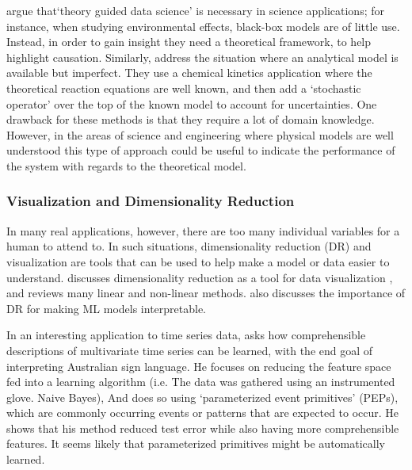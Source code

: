     \citet{Faghmous2014-og} argue that`theory guided data science' is necessary in science applications; for instance, when studying environmental effects, black-box models are of little use. Instead, in order to gain insight they need a theoretical framework, to help highlight causation. Similarly, \citet{Morrison2016-fz} address the situation where an analytical model is available but imperfect. They use a chemical kinetics application where the theoretical reaction equations are well known, and then add a `stochastic operator' over the top of the known model to account for uncertainties. One drawback for these methods is that they require a lot of domain knowledge. However, in the areas of science and engineering where physical models are well understood this type of approach could be useful to indicate the performance of the system with regards to the theoretical model. 

\subsubsection{Visualization and Dimensionality Reduction}
     In many real applications, however, there are too many individual variables for a human to attend to. In such situations, dimensionality reduction (DR) and visualization are tools that can be used to help make a model or data easier to understand. \citet{Venna2007-yj} discusses dimensionality reduction as a tool for data visualization , and reviews many linear and non-linear  methods. \citet{Vellido2012-nm} also discusses the importance of DR for making ML models interpretable.

    In an interesting application to time series data, \citet{Kadous1999-rx} asks how comprehensible descriptions of multivariate time series can be learned, with the end goal of interpreting Australian sign language. He focuses on reducing the feature space fed into a learning algorithm (i.e. The data was gathered using an instrumented glove. Naive Bayes), And does so using `parameterized event primitives' (PEPs), which are commonly occurring events or patterns that are expected to occur.  He shows that his method reduced test error while also having more comprehensible features. It seems likely that parameterized primitives might be automatically learned. 

